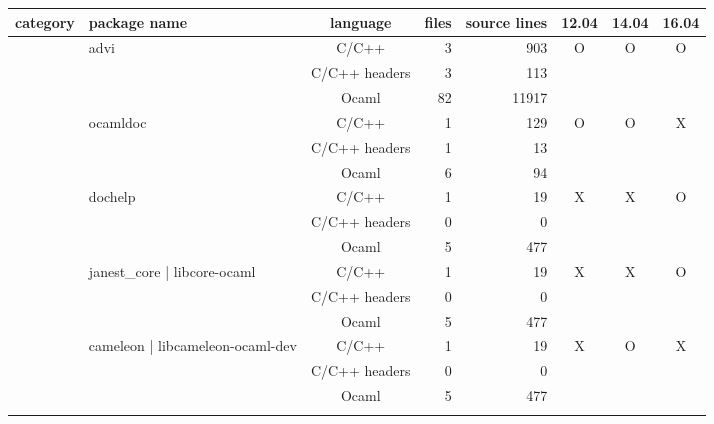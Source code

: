 \documentclass[11pt,a4paper]{article}
\begin{document}
\begin{table}[h,t]
\centering

\begin{tabular}{|>{\centering}m{3cm}| m{3cm}|c|r|r| c| c|c|}
 \hline
 category  &package name & language & files & source lines  & 12.04 & 14.04&16.04\\ 
 \hline

 \multirow{18}{3cm}{packages written in OCaml} & \multirow{3}{3cm}{advi} & C/C++ & 3 & 903 & \multirow{3}{*}{O} & \multirow{3}{*}{O} & \multirow{3}{*}{O}\\
 \cline{3-5}
 &  &                           C/C++ headers & 3 & 113 & & & \\
 \cline{3-5}
 & &                           Ocaml & 82 & 11917 & & & \\
 \cline{2-8}

 &\multirow{3}{3cm}{ocamldoc} & C/C++ & 1 & 129 & \multirow{3}{*}{O} & \multirow{3}{*}{O} & \multirow{3}{*}{X}\\
\cline{3-5}
& &                           C/C++ headers & 1 & 13 & & & \\
\cline{3-5}
& &                          Ocaml & 6 & 94 & & & \\
\cline{2-8}

 & \multirow{3}{*}{dochelp} & C/C++ & 1 & 19 & \multirow{3}{*}{X} & \multirow{3}{*}{X} & \multirow{3}{*}{O}\\
 \cline{3-5}
 &  &                           C/C++ headers & 0 & 0 & & & \\
 \cline{3-5}
 & &                           Ocaml & 5 & 477 & & & \\
 \cline{2-8}

 & \multirow{3}{3cm}{janest\_core | libcore-ocaml} & C/C++ & 1 & 19 & \multirow{3}{*}{X} & \multirow{3}{*}{X} & \multirow{3}{*}{O}\\
 \cline{3-5}
 &  &                           C/C++ headers & 0 & 0 & & & \\
 \cline{3-5}
 & &                           Ocaml & 5 & 477 & & & \\
 \cline{2-8}


& \multirow{3}{3cm}{cameleon | libcameleon-ocaml-dev} & C/C++ & 1 & 19 & \multirow{3}{*}{X} & \multirow{3}{*}{O} & \multirow{3}{*}{X}\\
 \cline{3-5}
 &  &                           C/C++ headers & 0 & 0 & & & \\
 \cline{3-5}
 & &                           Ocaml & 5 & 477 & & & \\
 \cline{2-8}



\end{tabular}
\end{table}
\end{document}
